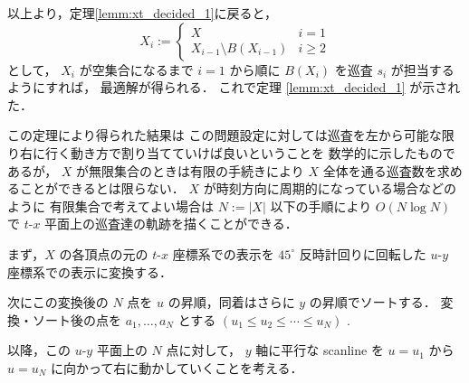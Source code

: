 以上より，定理\ref{lemm:xt_decided_1}に戻ると，
\[
X_i := 
\begin{cases}
	X & i = 1 \\
	X_{i - 1} \setminus B(X_{i - 1}) & i \geq 2
\end{cases}
\]
として，
$X_i$ が空集合になるまで $i = 1$ から順に $B(X_i)$ を巡査 $s_i$ が担当するようにすれば，
最適解が得られる．
これで定理 \ref{lemm:xt_decided_1} が示された．

この定理により得られた結果は
この問題設定に対しては巡査を左から可能な限り右に行く動き方で割り当てていけば良いということを
数学的に示したものであるが，
$X$ が無限集合のときは有限の手続きにより $X$ 全体を通る巡査数を求めることができるとは限らない．
$X$ が時刻方向に周期的になっている場合などのように
有限集合で考えてよい場合は $N := |X|$ 以下の手順により $O(N \log N)$ で
$t$-$x$ 平面上の巡査達の軌跡を描くことができる．

まず，$X$ の各頂点の元の $t$-$x$ 座標系での表示を
$45^\circ$ 反時計回りに回転した $u$-$y$ 座標系での表示に変換する．

次にこの変換後の $N$ 点を $u$ の昇順，同着はさらに $y$ の昇順でソートする．
変換・ソート後の点を
$a_1, \ldots, a_N$  とする $( u_1 \leq u_2 \leq \cdots \leq u_N)$ .

以降，この $u$-$y$ 平面上の $N$ 点に対して，
$y$ 軸に平行な scanline を $u = u_1$ から $u = u_N$ に向かって右に動かしていくことを考える．

